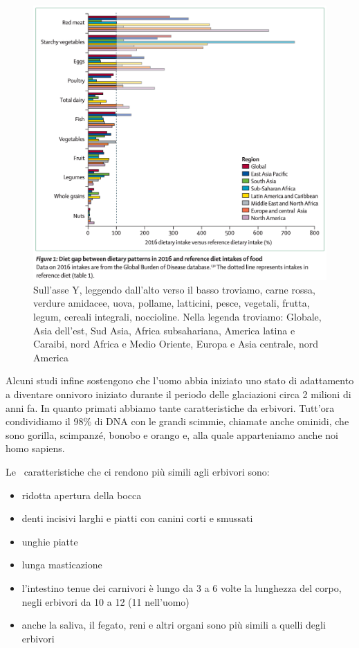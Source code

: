 \documentclass[12pt]{book} %
\begin{document}
\begin{figure}[H]
  \begin{minipage}{17cm}
    \includegraphics[width=17cm]{images/Libro-img023.png}
    \caption{Sull'asse Y, leggendo dall'alto verso il basso troviamo, carne rossa, verdure
amidacee, uova, pollame, latticini, pesce, vegetali, frutta, legum, cereali integrali, noccioline. 
Nella legenda troviamo: Globale, Asia dell'est, Sud Asia, Africa subsahariana, America latina e Caraibi, nord Africa e Medio Oriente, Europa e Asia centrale, nord America }
  \end{minipage}
\end{figure}

Alcuni studi infine sostengono che l'uomo abbia iniziato uno stato di adattamento a diventare onnivoro iniziato durante
il periodo delle glaciazioni circa 2 milioni di anni fa. In quanto primati abbiamo tante caratteristiche da erbivori.
Tutt'ora condividiamo il 98\% di DNA con le grandi scimmie, chiamate anche ominidi, che sono gorilla, scimpanzé, bonobo
e orango e, alla quale apparteniamo anche noi homo sapiens. 

Le \ caratteristiche che ci rendono più simili agli erbivori sono:

\begin{itemize}
\item ridotta apertura della bocca
\item denti incisivi larghi e piatti con canini corti e smussati
\item unghie piatte
\item lunga masticazione
\item l'intestino tenue dei carnivori è lungo da 3 a 6 volte la lunghezza del corpo, negli erbivori da 10 a 12 (11
nell'uomo)
\item anche la saliva, il fegato, reni e altri organi sono più simili a quelli degli erbivori
\end{itemize}
\end{document}
